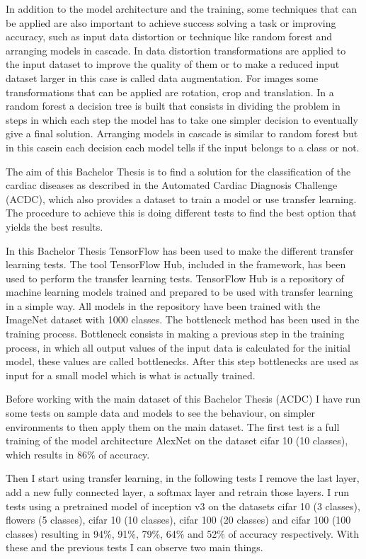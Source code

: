 \documentclass[12pt,a4paper]{article}
\begin{document}
In addition to the model architecture and the training, some techniques that can be applied are also important to achieve success solving a task or improving accuracy, such as input data distortion or technique like random forest and arranging models in cascade. In data distortion transformations are applied to the input dataset to improve the quality of them or to make a reduced input dataset larger in this case is called data augmentation. For images some transformations that can be applied are rotation, crop and translation. In a random forest a decision tree is built that consists in dividing the problem in steps in which each step the model has to take one simpler decision to eventually give a final solution. Arranging models in cascade is similar to random forest but in this casein each decision each model tells if the input belongs to a class or not.
\bigskip

The aim of this Bachelor Thesis is to find a solution for the classification of the cardiac diseases as described in the Automated Cardiac Diagnosis Challenge (ACDC), which also provides a dataset to train a model or use transfer learning. The procedure to achieve this is doing different tests to find the best option that yields the best results.
\bigskip

In this Bachelor Thesis TensorFlow has been used to make the different transfer learning tests. The tool TensorFlow Hub, included in the framework, has been used to perform the transfer learning tests. TensorFlow Hub is a repository of machine learning models trained and prepared to be used with transfer learning in a simple way. All models in the repository have been trained with the ImageNet dataset with 1000 classes. The bottleneck method has been used in the training process. Bottleneck consists in making a previous step in the training process, in which all output values of the input data is calculated for the initial model, these values are called bottlenecks. After this step bottlenecks are used as input for a small model which is what is actually trained.
\bigskip

Before working with the main dataset of this Bachelor Thesis (ACDC) I have run some tests on sample data and models to see the behaviour, on simpler environments to then apply them on the main dataset. The first test is a full training of the model architecture AlexNet on the dataset cifar 10 (10 classes), which results in 86\% of accuracy.
\bigskip

Then I start using transfer learning, in the following tests I remove the last layer, add a new fully connected layer, a softmax layer and retrain those layers. I run tests using a pretrained model of inception v3 on the datasets cifar 10 (3 classes), flowers (5 classes), cifar 10 (10 classes), cifar 100 (20 classes) and cifar 100 (100 classes) resulting in 94\%, 91\%, 79\%, 64\% and 52\% of accuracy respectively. With these and the previous tests I can observe two main things.
\bigskip
\end{document}
